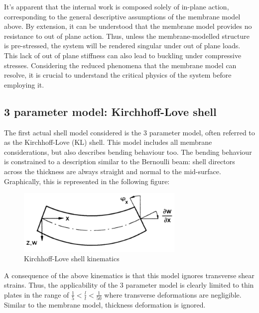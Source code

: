 
It's apparent that the internal work is composed solely of in-plane action, corresponding to the general descriptive assumptions of the membrane model above. By extension, it can be understood that the membrane model provides no resistance to out of plane action. Thus, unless the membrane-modelled structure is pre-stressed, the system will be rendered singular under out of plane loads. This lack of out of plane stiffness can also lead to buckling under compressive stresses. Considering the reduced phenomena that the membrane model can resolve, it is crucial to understand the critical physics of the system before employing it.

\subsection{3 parameter model: Kirchhoff-Love shell}

The first actual shell model considered is the 3 parameter model, often referred to as the Kirchhoff-Love (KL) shell. This model includes all membrane considerations, but also describes bending behaviour too. The bending behaviour is constrained to a description similar to the Bernoulli beam: shell directors across the thickness are always straight and normal to the mid-surface. Graphically, this is represented in the following figure:

\begin{figure}[H]
	\centering
	\def\svgwidth{\columnwidth}
	\includegraphics[width=8cm]{images/bernoullie.png}
	\caption{Kirchhoff-Love shell kinematics \cite{Bletz16}}
	\label{thinshellkine1}
\end{figure}

A consequence of the above kinematics is that this model ignores transverse shear strains. Thus, the applicability of the 3 parameter model is clearly limited to thin plates in the range of $\frac{1}{5} < \frac{l}{t} < \frac{1}{50}$ where transverse deformations are negligible. Similar to the membrane model, thickness deformation is ignored. \\

